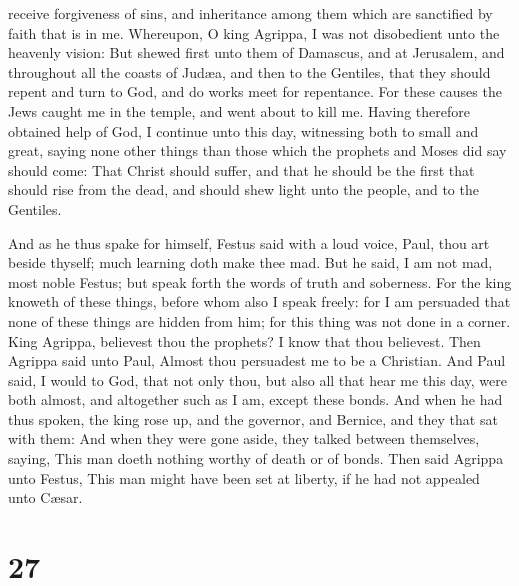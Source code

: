 receive forgiveness of sins, and inheritance among them which are
sanctified by faith that is in me.  Whereupon, O king
Agrippa, I was not disobedient unto the heavenly vision: 
But shewed first unto them of Damascus, and at Jerusalem, and throughout
all the coasts of Judæa, and then to the Gentiles, that they should
repent and turn to God, and do works meet for repentance.
 For these causes the Jews caught me in the temple, and
went about to kill me.  Having therefore obtained help of
God, I continue unto this day, witnessing both to small and great,
saying none other things than those which the prophets and Moses did say
should come:  That Christ should suffer, and that he
should be the first that should rise from the dead, and should shew
light unto the people, and to the Gentiles.

 And as he thus spake for himself, Festus said with a
loud voice, Paul, thou art beside thyself; much learning doth make thee
mad.  But he said, I am not mad, most noble Festus; but
speak forth the words of truth and soberness.  For the
king knoweth of these things, before whom also I speak freely: for I am
persuaded that none of these things are hidden from him; for this thing
was not done in a corner.  King Agrippa, believest thou
the prophets? I know that thou believest.  Then Agrippa
said unto Paul, Almost thou persuadest me to be a Christian.
 And Paul said, I would to God, that not only thou, but
also all that hear me this day, were both almost, and altogether such as
I am, except these bonds.  And when he had thus spoken,
the king rose up, and the governor, and Bernice, and they that sat with
them:  And when they were gone aside, they talked between
themselves, saying, This man doeth nothing worthy of death or of bonds.
 Then said Agrippa unto Festus, This man might have been
set at liberty, if he had not appealed unto Cæsar.

\hypertarget{section-26}{%
\section{27}\label{section-26}}

